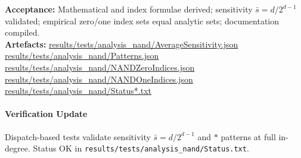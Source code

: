 \documentclass[11pt]{article}
\begin{document}
\textbf{Acceptance:} Mathematical and index formulae derived; sensitivity \(\bar{s}=d/2^{d-1}\) validated; empirical zero/one index sets equal analytic sets; documentation compiled.\\
\textbf{Artefacts:} \url{results/tests/analysis_nand/AverageSensitivity.json}\\
\url{results/tests/analysis_nand/Patterns.json}\\
\url{results/tests/analysis_nand/NANDZeroIndices.json}\\
\url{results/tests/analysis_nand/NANDOneIndices.json}\\
\url{results/tests/analysis_nand/Status*.txt}
\paragraph{Verification Update} Dispatch-based tests validate sensitivity \(\bar{s}=d/2^{d-1}\) and \(*\) patterns at full in-degree. Status OK in \texttt{results/tests/analysis\_nand/Status.txt}.
\end{document}
